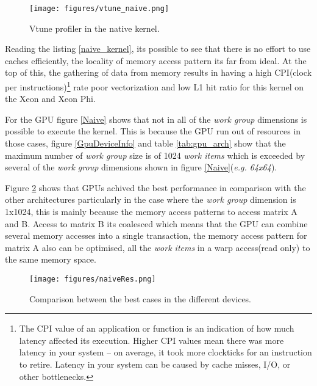 \begin{figure}[!h]
    \centering
    \texttt{[image: figures/vtune\_naive.png]}
    \caption{Vtune profiler in the native kernel.}
    \label{vtune_naive}
\end{figure}

\par{{\color{red}Reading the listing \ref{naive_kernel}, its possible to see that there is no effort to use caches efficiently, the locality of
    memory access pattern its far from ideal. At the top of this, the gathering of data from memory results in having a high CPI(clock per
    instructions)\footnote{The CPI value of an application or function is an indication of how much latency affected its execution. 
    Higher CPI values mean there was more latency in your system – on average, it took more clockticks for an instruction to retire. 
    Latency in your system can be caused by cache misses, I/O, or other bottlenecks\cite{cpi}.} 
    rate poor vectorization and low L1 hit ratio for this kernel on the Xeon and Xeon Phi.}}

\par{For the GPU figure \ref{Naive} shows that not in all of the 
    \emph{work group} dimensions is possible to execute the kernel. 
    This is because the GPU run out of resources in those cases\cite{opencl_error},
    figure \ref{GpuDeviceInfo} and table \ref{tab:gpu_arch} show that the 
    maximum number of \emph{work group} size is of 1024 \emph{work items} which
    is exceeded by several of the \emph{work group} dimensions shown in figure 
    \ref{Naive}(\emph{e.g. 64x64}).}

\par{Figure \ref{NaiveRes} shows that GPUs achived the best performance in 
    comparison with the other architectures particularly
    in the case where the \emph{work group} dimension is 1x1024,
    this is mainly because the memory access patterns to access matrix A and B. 
    Access to matrix B its coalesced which means that the GPU can combine several 
    memory accesses into a single transaction, the memory access pattern for matrix 
    A also can be optimised, all the \emph{work items} in a warp access(read only)
    to the same memory space}.

\begin{figure}[!h]
    \centering
    \texttt{[image: figures/naiveRes.png]}
    \caption{Comparison between the best cases in the different devices.}
    \label{NaiveRes}
\end{figure}

